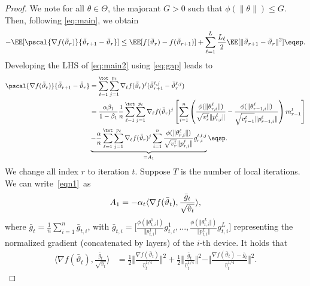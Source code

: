 \documentclass[nohyperref]{article}
\begin{document}
\begin{proof}
We note for all $\theta \in \Theta$, the majorant $G > 0$ such that $\phi(\|\theta \|) \leq G$. 
Then, following \eqref{eq:main}, we obtain
\begin{align}\label{eq:main2}
- \EE[  \pscal{\nabla f(\bar{\vartheta}_r)}{\bar{\vartheta}_{r+1} - \bar{\vartheta}_r}]  \leq  \EE[ f(\bar{\vartheta}_r) - f(\bar{\vartheta}_{r+1})] + \sum_{\ell =1}^L \frac{L_\ell}{2} \EE[  \| \bar{\vartheta}_{r+1} - \bar{\vartheta}_r \|^2] \eqsp.
\end{align}
Developing the LHS of \eqref{eq:main2} using \eqref{eq:gap} leads to
\begin{align} \notag
\pscal{\nabla f(\bar{\vartheta}_r)}{\bar{\vartheta}_{r+1} - \bar{\vartheta}_r} &= \sum_{\ell=1}^\tot \sum_{j=1}^{p_\ell} \nabla_{\ell} f(\bar{\vartheta}_r)^j (\bar{\vartheta}^{\ell,j}_{r+1} - \bar{\vartheta}^{\ell,j}_r)  \\ \notag
& =  \frac{\alpha \beta_1}{1-\beta_1}\frac{1}{n}  \sum_{\ell=1}^\tot \sum_{j=1}^{p_\ell} \nabla_{\ell} f(\bar{\vartheta}_r)^j \left[   \sum_{i = 1}^n  \left( \frac{\phi(\|\theta_{r,i}^{\ell}\|)}{\sqrt{v^{t}_{r}} \|p_{r,i}^{\ell}\|} - \frac{\phi(\|\theta_{r-1,i}^{\ell}\|)}{\sqrt{v^{t}_{r-1}} \|p_{r-1,i}^{\ell}\|} \right) m^{t}_{r-1}  \right] \\ \label{eqn1}
& \underbrace{ -\frac{\alpha}{n} \sum_{\ell=1}^\tot \sum_{j=1}^{p_\ell} \nabla_{\ell} f(\bar{\vartheta}_r)^j  \sum_{i = 1}^n \frac{\phi(\|\theta_{r,i}^{\ell}\|)}{\sqrt{v^{t}_{r}} \|p_{r,i}^{\ell}\|} g_{r,i}^{t,l,j}}_{= A_1}   \eqsp.
\end{align}
We change all index $r$ to iteration $t$. 
Suppose $T$ is the number of local iterations. We can write~\eqref{eqn1}~as
\begin{align}\notag
    A_1=-\alpha_t \langle \nabla f(\bar \vartheta_t),\frac{\bar g_t}{\sqrt{\hat v_t}} \rangle,
\end{align}
where $\bar g_t=\frac{1}{n}\sum_{i=1}^n \bar g_{t,i}$, with $\bar g_{t,i}=\Big[\frac{\phi(\Vert \theta_{t,i}^1\Vert)}{\Vert p_{t,i}^1\Vert}g_{t,i}^1,..., \frac{\phi(\Vert \theta_{t,i}^L\Vert)}{\Vert p_{t,i}^L\Vert}g_{t,i}^L   \Big]$ representing the normalized gradient (concatenated by layers) of the $i$-th device. It holds that
\begin{align}
    \langle \nabla f(\bar \vartheta_t),\frac{\bar g_t}{\sqrt{\hat v_t}} \rangle&=\frac{1}{2}\Vert \frac{\nabla f(\bar\vartheta_t) }{\hat v_t^{1/4}}\Vert^2+\frac{1}{2}\Vert \frac{\bar g_t }{\hat v_t^{1/4}}\Vert^2-\Vert \frac{\nabla f(\bar\vartheta_t)-\bar g_t }{\hat v_t^{1/4}}\Vert^2.  \label{eqn:x1}
\end{align}


\end{proof}
\end{document}
